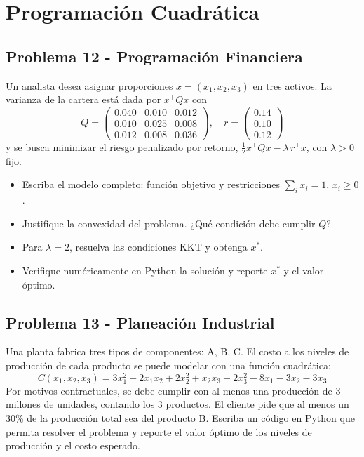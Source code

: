 \documentclass[12pt]{article}
\begin{document}
\section{Programación Cuadrática}

\subsection*{Problema 12 - Programación Financiera}

Un analista desea asignar proporciones $x = (x_1, x_2, x_3)$ en tres activos. La varianza de la cartera está dada por $x^\top Q x$ con
\[
Q = \begin{pmatrix}
0.040 & 0.010 & 0.012 \\
0.010 & 0.025 & 0.008 \\
0.012 & 0.008 & 0.036
\end{pmatrix},\quad r = \begin{pmatrix}0.14 \\ 0.10 \\ 0.12\end{pmatrix}
\]
y se busca minimizar el riesgo penalizado por retorno, $\tfrac{1}{2} x^\top Q x - \lambda\, r^\top x$, con $\lambda>0$ fijo.
\begin{itemize}
    \item[a)] Escriba el modelo completo: función objetivo y restricciones $\sum_i x_i = 1$, $x_i \ge 0$.
    \item[b)] Justifique la convexidad del problema. ¿Qué condición debe cumplir $Q$?
    \item[c)] Para $\lambda = 2$, resuelva las condiciones KKT y obtenga $x^*$.
    \item[d)] Verifique numéricamente en Python la solución y reporte $x^*$ y el valor óptimo.
\end{itemize}

\subsection*{Problema 13 - Planeación Industrial}

Una planta fabrica tres tipos de componentes: A, B, C. El costo a los niveles de producción de cada producto se puede modelar con una función cuadrática:
\begin{equation*}
    C(x_1, x_2, x_3) = 3x_1^2 + 2x_1 x_2 + 2x_2^2+x_2 x_3 + 2x_3^2 - 8x_1 - 3x_2 - 3x_3
\end{equation*}
Por motivos contractuales, se debe cumplir con al menos una producción de 3 millones de unidades, contando los 3 productos. El cliente pide que al menos un 30\% de la producción total sea del producto B. Escriba un código en Python que permita resolver el problema y reporte el valor óptimo de los niveles de producción y el costo esperado.
\end{document}
